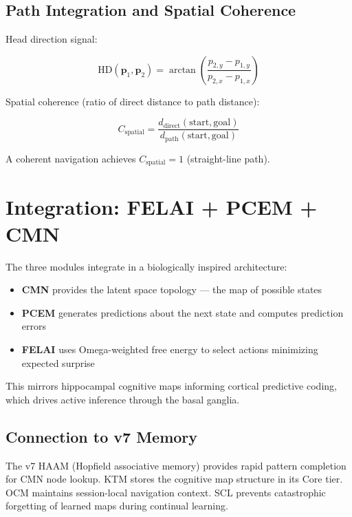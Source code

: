 \documentclass[11pt]{article}
\theoremstyle{plain}
\begin{document}
\subsection{Path Integration and Spatial Coherence}

Head direction signal:

\begin{equation}
\text{HD}(\mathbf{p}_1, \mathbf{p}_2) = \arctan\left(\frac{p_{2,y} - p_{1,y}}{p_{2,x} - p_{1,x}}\right)
\end{equation}

Spatial coherence (ratio of direct distance to path distance):

\begin{equation}
C_{\text{spatial}} = \frac{d_{\text{direct}}(\text{start}, \text{goal})}{d_{\text{path}}(\text{start}, \text{goal})}
\end{equation}

A coherent navigation achieves \( C_{\text{spatial}} = 1 \) (straight-line path).


\section{Integration: FELAI + PCEM + CMN}

The three modules integrate in a biologically inspired architecture:

\begin{itemize}
  \item \textbf{CMN} provides the latent space topology — the map of possible states
  \item \textbf{PCEM} generates predictions about the next state and computes prediction errors
  \item \textbf{FELAI} uses Omega-weighted free energy to select actions minimizing expected surprise
\end{itemize}

This mirrors hippocampal cognitive maps informing cortical predictive coding, which drives active inference through the basal ganglia.

\subsection{Connection to v7 Memory}

The v7 HAAM (Hopfield associative memory) provides rapid pattern completion for CMN node lookup. KTM stores the cognitive map structure in its Core tier. OCM maintains session-local navigation context. SCL prevents catastrophic forgetting of learned maps during continual learning.
\end{document}
